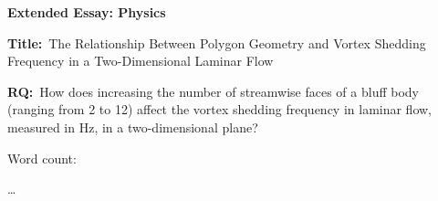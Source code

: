 \documentclass[12pt]{article}
\begin{document}
\begin{titlepage}
	\begin{center}
		\textbf{Extended Essay: Physics}
		
		\vspace*{4cm}
		
		\textbf{Title:}\
		The Relationship Between Polygon Geometry and Vortex Shedding Frequency in a Two-Dimensional Laminar Flow
		\vspace{1cm}
		
		\textbf{RQ:}\
		How does increasing the number of streamwise faces of a bluff body (ranging from 2 to 12) affect the vortex shedding frequency in laminar flow, measured in Hz, in a two-dimensional plane?
		\vspace{4cm}
		
		Word count:
		
		\ldots
		\vfill
		
		\vspace{0.1cm}
	\end{center}
\end{titlepage}
	
	
\tableofcontents
\newpage
	









\printbibliography

\clearpage

\appendix
{}



	
\end{document}
